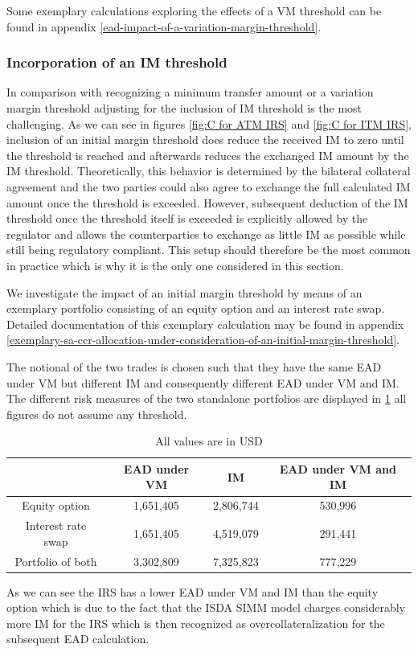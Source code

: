 \documentclass[../Thesis_AHoecherl.tex]{subfiles}
\begin{document}
    Some exemplary calculations exploring the effects of a VM threshold can be found in appendix \ref{ead-impact-of-a-variation-margin-threshold}.

    \subsubsection{Incorporation of an IM threshold\label{sec:Incorporation of an IM threshold}}
    
    In comparison with recognizing a minimum transfer amount or a variation margin threshold adjusting for the inclusion of IM threshold is the most challenging.
    As we can see in figures \ref{fig:C for ATM IRS} and \ref{fig:C for ITM IRS}, inclusion of an initial margin threshold does reduce the received IM to zero until the threshold is reached and afterwards reduces the exchanged IM amount by the IM threshold.
    Theoretically, this behavior is determined by the bilateral collateral agreement and the two parties could also agree to exchange the full calculated IM amount once the threshold is exceeded.
    However, subsequent deduction of the IM threshold once the threshold itself is exceeded is explicitly allowed by the regulator \cite[Background discussion 2(h)]{BCBS_MarginRequirements} and allows the counterparties to exchange as little IM as possible while still being regulatory compliant.
    This setup should therefore be the most common in practice which is why it is the only one considered in this section.

    We investigate the impact of an initial margin threshold by means of an exemplary portfolio consisting of an equity option and an interest rate swap.
    Detailed documentation of this exemplary calculation may be found in appendix \ref{exemplary-sa-ccr-allocation-under-consideration-of-an-initial-margin-threshold}.

    The notional of the two trades is chosen such that they have the same EAD under VM but different IM and consequently different EAD under VM and IM. 
    The different risk measures of the two standalone portfolios are displayed in \ref{tab:IM threshold example standalone} all figures do not assume any threshold.
    \begin{table}[htbp]
        \centering
        \begin{tabular}{c|c|c|c}
            & EAD under VM & IM & EAD under VM and IM \\
            \toprule
            Equity option & 1,651,405 & 2,806,744 & 530,996 \\
            Interest rate swap& 1,651,405 & 4,519,079 & 291,441 \\
            \midrule
            Portfolio of both& 3,302,809 & 7,325,823 & 777,229 \\
        \end{tabular}%
        \caption{All values are in USD}
        \label{tab:IM threshold example standalone}
    \end{table}
    As we can see the IRS has a lower EAD under VM and IM than the equity option which is due to the fact that the ISDA SIMM model charges considerably more IM for the IRS which is then recognized as overcollateralization for the subsequent EAD calculation.
\end{document}
